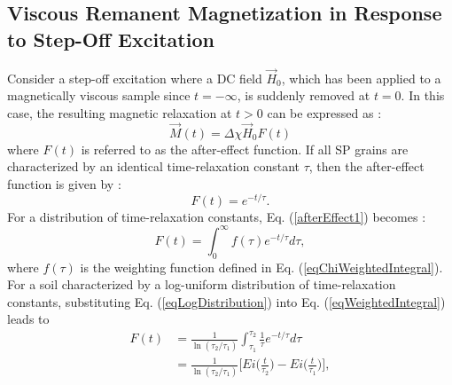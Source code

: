 \documentclass[onecolumn]{IEEEtran} %
\begin{document}

\subsection{Viscous Remanent Magnetization in Response to Step-Off Excitation}

Consider a step-off excitation where a DC field $\vec H_0$, which
has been applied to a magnetically viscous sample since $t =
-\infty$, is suddenly removed at $t=0$. In this case, the resulting
magnetic relaxation at $t >0$ can be expressed as
\cite{Neel1949,Billings2003,Pasion2007}:
\begin{equation}
\vec M(t) = \Delta \chi \vec H_0 F(t)
\label{eqMagSte}
\end{equation}
where $F(t)$ is referred to as the after-effect function. If all SP
grains are characterized by an identical time-relaxation constant
$\tau$, then the after-effect function is given by
\cite{Neel1949,Billings2003,Pasion2007}:
\begin{equation}
F (t) = e^{-t/\tau}. \label{afterEffect1}
\end{equation}
For a distribution of time-relaxation constants, Eq.
(\ref{afterEffect1}) becomes
\cite{Neel1949,Mullins1973,Billings2003,Pasion2007}:
\begin{equation}
\label{eqWeightedIntegral} F(t) = \int^{\infty}_0 f(\tau)
e^{-t/\tau} d \tau,
\end{equation}
where $f(\tau)$ is the weighting function defined in Eq.
(\ref{eqChiWeightedIntegral}). For a soil characterized by a
log-uniform distribution of time-relaxation constants, substituting
Eq. (\ref{eqLogDistribution}) into Eq. (\ref{eqWeightedIntegral})
leads to
\begin{equation}
\begin{split}
F(t) &= \frac{1}{\ln(\tau_2/\tau_1)} \int^{\tau_2}_{\tau_1} \frac{1}{\tau} e^{-t/\tau} d \tau \\
 & = \frac{1}{\ln(\tau_2/\tau_1)} \Bigg [ Ei \Big
( \frac{t}{\tau_2} \Big ) - Ei \Big ( \frac{t}{\tau_1} \Big ) \Bigg
],
\end{split}
\label{eqIntDist}
\end{equation}
\end{document}
